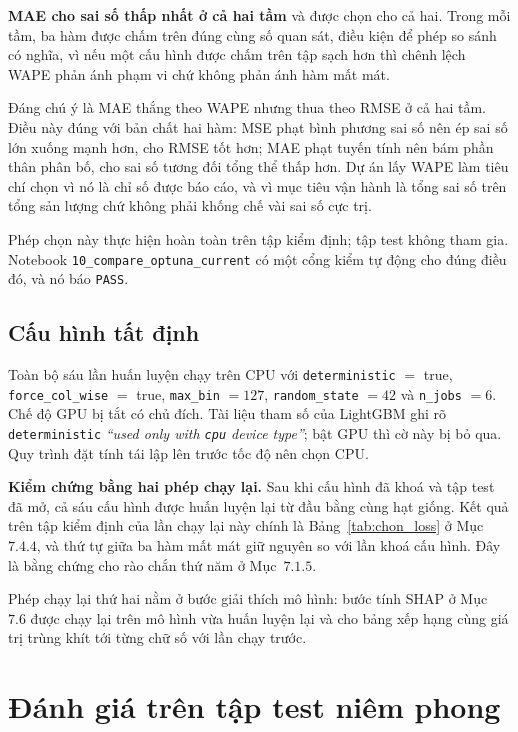 \documentclass[12pt, a4paper]{report}
\begin{document}
\textbf{MAE cho sai số thấp nhất ở cả hai tầm} và được chọn cho cả hai. Trong mỗi tầm, ba hàm
được chấm trên đúng cùng số quan sát, điều kiện để phép so sánh có nghĩa, vì nếu một cấu
hình được chấm trên tập sạch hơn thì chênh lệch WAPE phản ánh phạm vi chứ không phản ánh hàm
mất mát.

Đáng chú ý là MAE thắng theo WAPE nhưng thua theo RMSE ở cả hai tầm. Điều này đúng với bản chất
hai hàm: MSE phạt bình phương sai số nên ép sai số lớn xuống mạnh hơn, cho RMSE tốt hơn; MAE
phạt tuyến tính nên bám phần thân phân bố, cho sai số tương đối tổng thể thấp hơn. Dự án lấy
WAPE làm tiêu chí chọn vì nó là chỉ số được báo cáo, và vì mục tiêu vận hành là tổng sai số
trên tổng sản lượng chứ không phải khống chế vài sai số cực trị.

Phép chọn này thực hiện hoàn toàn trên tập kiểm định; tập test không tham gia. Notebook
\texttt{10\_compare\_optuna\_current} có một cổng kiểm tự động cho đúng điều đó, và nó báo
\texttt{PASS}.

\FloatBarrier
\subsection{Cấu hình tất định}

Toàn bộ sáu lần huấn luyện chạy trên CPU với \texttt{deterministic} $=$ true,
\texttt{force\_col\_wise} $=$ true, \texttt{max\_bin} $=127$, \texttt{random\_state} $=42$ và
\texttt{n\_jobs} $=6$. Chế độ GPU bị tắt có chủ đích. Tài liệu tham số của LightGBM ghi rõ
\texttt{deterministic} \textit{``used only with \texttt{cpu} device type''}; bật GPU thì cờ này
bị bỏ qua. Quy trình đặt tính tái lập lên trước tốc độ nên chọn CPU.



\textbf{Kiểm chứng bằng hai phép chạy lại.} Sau khi cấu hình đã khoá và tập test đã mở, cả sáu
cấu hình được huấn luyện lại từ đầu bằng cùng hạt giống. Kết quả trên tập kiểm định của lần
chạy lại này chính là Bảng~\ref{tab:chon_loss} ở Mục~$7.4.4$, và thứ tự giữa ba hàm mất mát giữ
nguyên so với lần khoá cấu hình. Đây là bằng chứng cho rào chắn thứ năm ở Mục~$7.1.5$.

Phép chạy lại thứ hai nằm ở bước giải thích mô hình: bước tính SHAP ở Mục~$7.6$ được chạy lại
trên mô hình vừa huấn luyện lại và cho bảng xếp hạng cùng giá trị trùng khít tới từng chữ số
với lần chạy trước.

\FloatBarrier
\section{Đánh giá trên tập test niêm phong}
\end{document}
